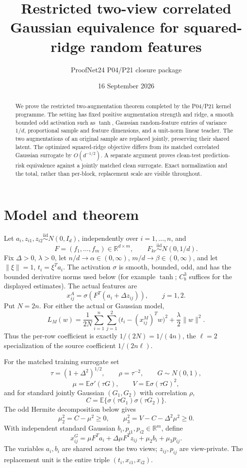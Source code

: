 \documentclass[11pt]{article}
\title{Restricted two-view correlated Gaussian equivalence for squared-ridge random features}
\author{ProofNet24 P04/P21 closure package}
\date{16 September 2026}
\newcommand{\E}{\mathbb E}
\newcommand{\R}{\mathbb R}
\begin{document}
\maketitle

\begin{abstract}
We prove the restricted two-augmentation theorem completed by the P04/P21 kernel programme.  The setting has fixed positive augmentation strength and ridge, a smooth bounded odd activation such as \(\tanh\), Gaussian random-feature entries of variance \(1/d\), proportional sample and feature dimensions, and a unit-norm linear teacher.  The two augmentations of an original sample are replaced jointly, preserving their shared latent.  The optimized squared-ridge objective differs from its matched correlated Gaussian surrogate by \(O(d^{-1/2})\).  A separate argument proves clean-test prediction-risk equivalence against a jointly matched clean surrogate.  Exact normalization and the total, rather than per-block, replacement scale are visible throughout.
\end{abstract}

\section{Model and theorem}
Let \(a_i,z_{i1},z_{i2}\stackrel{\mathrm{iid}}{\sim}N(0,I_d)\), independently over \(i=1,\ldots,n\), and
\[
 F=(f_1,\ldots,f_m)\in\R^{d\times m},\qquad F_{kr}\stackrel{\mathrm{iid}}{\sim}N(0,1/d).
\]
Fix \(\Delta>0\), \(\lambda>0\), let \(n/d\to\alpha\in(0,\infty)\), \(m/d\to\beta\in(0,\infty)\), and let \(\|\xi\|=1\), \(t_i=\xi^Ta_i\).  The activation \(\sigma\) is smooth, bounded, odd, and has the bounded derivative norms used below (for example \(\tanh\); \(C_b^3\) suffices for the displayed estimates).  The actual features are
\[
 x_{ij}^{A}=\sigma\!\left(F^T(a_i+\Delta z_{ij})\right),\qquad j=1,2.
\]
Put \(N=2n\).  For either the actual or Gaussian model,
\begin{equation}\label{eq:objective}
 L_M(w)=\frac1{2N}\sum_{i=1}^n\sum_{j=1}^2
 \bigl(t_i-(x_{ij}^{M})^Tw\bigr)^2+\frac\lambda2\|w\|^2.
\end{equation}
Thus the per-row coefficient is exactly \(1/(2N)=1/(4n)\), the \(\ell=2\) specialization of the source coefficient \(1/(2n\ell)\).

For the matched training surrogate set
\[
 \tau=(1+\Delta^2)^{1/2},\qquad \rho=\tau^{-2},\qquad G\sim N(0,1),
\]
\[
 \mu=\E\sigma'(\tau G),\qquad V=\E\sigma(\tau G)^2,
\]
and for standard jointly Gaussian \((G_1,G_2)\) with correlation \(\rho\),
\[
 C=\E\{\sigma(\tau G_1)\sigma(\tau G_2)\}.
\]
The odd Hermite decomposition below gives
\[
 \mu_2^2=C-\mu^2\ge0,
 \qquad
 \mu_3^2=V-C-\Delta^2\mu^2\ge0.
\]
With independent standard Gaussian \(b_i,p_{i1},p_{i2}\in\R^m\), define
\begin{equation}\label{eq:surrogate}
 x_{ij}^{G}=\mu F^Ta_i+\Delta\mu F^Tz_{ij}+\mu_2b_i+\mu_3p_{ij}.
\end{equation}
The variables \(a_i,b_i\) are shared across the two views; \(z_{ij},p_{ij}\) are view-private.  The replacement unit is the entire triple \((t_i,x_{i1},x_{i2})\).
\end{document}
